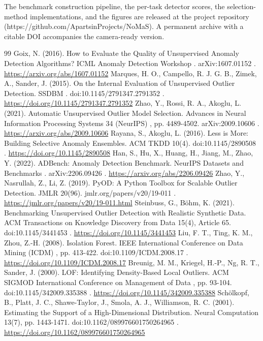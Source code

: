 \documentclass[3p,twocolumn]{elsarticle}
\begin{document}
The benchmark construction pipeline, the per-task detector scores, the selection-method implementations, and the figures are released at the project repository (https://github.com/ApartsinProjects/NoMaS). A permanent archive with a citable DOI accompanies the camera-ready version.




\begin{thebibliography}{99}
\setlength{\itemsep}{2pt plus 0.5pt}\setlength{\parsep}{0pt}
\label{r1} Goix, N. (2016). How to Evaluate the Quality of Unsupervised Anomaly Detection Algorithms? ICML Anomaly Detection Workshop . arXiv:1607.01152 . \url{https://arxiv.org/abs/1607.01152}
\label{r2} Marques, H. O., Campello, R. J. G. B., Zimek, A., Sander, J. (2015). On the Internal Evaluation of Unsupervised Outlier Detection. SSDBM . doi:10.1145/2791347.2791352 . \url{https://doi.org/10.1145/2791347.2791352}
\label{r3} Zhao, Y., Rossi, R. A., Akoglu, L. (2021). Automatic Unsupervised Outlier Model Selection. Advances in Neural Information Processing Systems 34 (NeurIPS) , pp. 4489-4502. arXiv:2009.10606 . \url{https://arxiv.org/abs/2009.10606}
\label{r4} Rayana, S., Akoglu, L. (2016). Less is More: Building Selective Anomaly Ensembles. ACM TKDD 10(4). doi:10.1145/2890508 . \url{https://doi.org/10.1145/2890508}
\label{r5} Han, S., Hu, X., Huang, H., Jiang, M., Zhao, Y. (2022). ADBench: Anomaly Detection Benchmark. NeurIPS Datasets and Benchmarks . arXiv:2206.09426 . \url{https://arxiv.org/abs/2206.09426}
\label{r6} Zhao, Y., Nasrullah, Z., Li, Z. (2019). PyOD: A Python Toolbox for Scalable Outlier Detection. JMLR 20(96). jmlr.org/papers/v20/19-011 . \url{https://jmlr.org/papers/v20/19-011.html}
\label{r7} Steinbuss, G., Böhm, K. (2021). Benchmarking Unsupervised Outlier Detection with Realistic Synthetic Data. ACM Transactions on Knowledge Discovery from Data 15(4), Article 65. doi:10.1145/3441453 . \url{https://doi.org/10.1145/3441453}
\label{r8} Liu, F. T., Ting, K. M., Zhou, Z.-H. (2008). Isolation Forest. IEEE International Conference on Data Mining (ICDM) , pp. 413-422. doi:10.1109/ICDM.2008.17 . \url{https://doi.org/10.1109/ICDM.2008.17}
\label{r9} Breunig, M. M., Kriegel, H.-P., Ng, R. T., Sander, J. (2000). LOF: Identifying Density-Based Local Outliers. ACM SIGMOD International Conference on Management of Data , pp. 93-104. doi:10.1145/342009.335388 . \url{https://doi.org/10.1145/342009.335388}
\label{r10} Schölkopf, B., Platt, J. C., Shawe-Taylor, J., Smola, A. J., Williamson, R. C. (2001). Estimating the Support of a High-Dimensional Distribution. Neural Computation 13(7), pp. 1443-1471. doi:10.1162/089976601750264965 . \url{https://doi.org/10.1162/089976601750264965}

\end{thebibliography}
\end{document}
